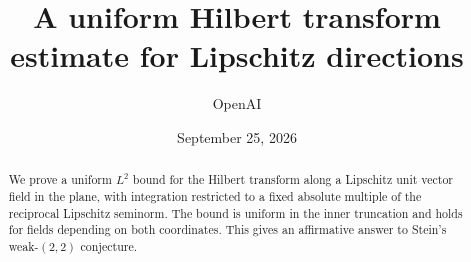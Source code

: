\documentclass[11pt,reqno]{amsart}
\title[Hilbert transforms along Lipschitz directions]{A uniform Hilbert transform estimate for Lipschitz directions}
\author{OpenAI}
\date{September 25, 2026}
\begin{document}
\begin{abstract}
We prove a uniform \(L^2\) bound for the Hilbert transform along a
Lipschitz unit vector field in the plane, with integration restricted
to a fixed absolute multiple of the reciprocal Lipschitz seminorm.
The bound is uniform in the inner truncation and holds for fields
depending on both coordinates. This gives an affirmative answer to
Stein's weak-\((2,2)\) conjecture.
\end{abstract}
\maketitle
\tableofcontents
\clearpage













\end{document}
